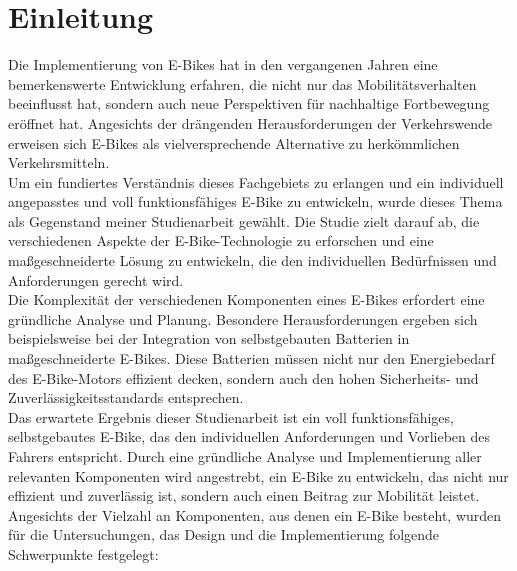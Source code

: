 
\chapter{Einleitung}

Die Implementierung von E-Bikes hat in den vergangenen Jahren eine bemerkenswerte Entwicklung erfahren, die nicht nur das Mobilitätsverhalten beeinflusst hat, sondern auch neue Perspektiven für nachhaltige Fortbewegung eröffnet hat. Angesichts der drängenden Herausforderungen der Verkehrswende erweisen sich E-Bikes als vielversprechende Alternative zu herkömmlichen Verkehrsmitteln.\\

Um ein fundiertes Verständnis dieses Fachgebiets zu erlangen und ein individuell angepasstes und voll funktionsfähiges E-Bike zu entwickeln, wurde dieses Thema als Gegenstand meiner Studienarbeit gewählt. Die Studie zielt darauf ab, die verschiedenen Aspekte der E-Bike-Technologie zu erforschen und eine maßgeschneiderte Lösung zu entwickeln, die den individuellen Bedürfnissen und Anforderungen gerecht wird.\\

Die Komplexität der verschiedenen Komponenten eines E-Bikes erfordert eine gründliche Analyse und Planung. Besondere Herausforderungen ergeben sich beispielsweise bei der Integration von selbstgebauten Batterien in maßgeschneiderte E-Bikes. Diese Batterien müssen nicht nur den Energiebedarf des E-Bike-Motors effizient decken, sondern auch den hohen Sicherheits- und Zuverlässigkeitsstandards entsprechen.\\

Das erwartete Ergebnis dieser Studienarbeit ist ein voll funktionsfähiges, selbstgebautes E-Bike, das den individuellen Anforderungen und Vorlieben des Fahrers entspricht. Durch eine gründliche Analyse und Implementierung aller relevanten Komponenten wird angestrebt, ein E-Bike zu entwickeln, das nicht nur effizient und zuverlässig ist, sondern auch einen Beitrag zur Mobilität leistet.\\

Angesichts der Vielzahl an Komponenten, aus denen ein E-Bike besteht, wurden für die Untersuchungen, das Design und die Implementierung folgende Schwerpunkte festgelegt:

